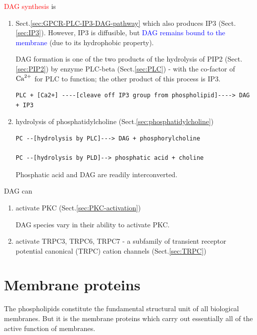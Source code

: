 \textcolor{red}{DAG synthesis} is 
\begin{enumerate}

  \item Sect.\ref{sec:GPCR-PLC-IP3-DAG-pathway} which also produces IP3
  (Sect.\ref{sec:IP3}). However, IP3 is diffusible, but \textcolor{blue}{DAG
  remains bound to the membrane} (due to its hydrophobic property).

DAG formation is one of the two products of the hydrolysis of PIP2
(Sect.\ref{sec:PIP2}) by enzyme PLC-beta (Sect.\ref{sec:PLC}) - with the
co-factor of ${\text{Ca}^{2+}}$ for PLC to function; the other product of this process is
IP3.

\begin{verbatim}
PLC + [Ca2+] ----[cleave off IP3 group from phospholipid]----> DAG + IP3
\end{verbatim}

  \item hydrolysis of phosphatidylcholine (Sect.\ref{sec:phosphatidylcholine})

\begin{verbatim}
PC --[hydrolysis by PLC]---> DAG + phosphorylcholine

PC --[hydrolysis by PLD]--> phosphatic acid + choline
\end{verbatim}

Phosphatic acid and DAG are readily interconverted.

\end{enumerate}


DAG can 
\begin{enumerate}
  \item activate PKC (Sect.\ref{sec:PKC-activation})

DAG species vary in their ability to activate PKC.
  
  \item activate TRPC3, TRPC6, TRPC7 - a subfamily of transient receptor
  potential canonical (TRPC) cation channels (Sect.\ref{sec:TRPC})
  
\end{enumerate}




\section{Membrane proteins}
\label{sec:membrane-proteins}

The phospholipids constitute the fundamental structural unit of all biological
membranes. But it is the membrane proteins which carry out essentially all of
the active function of membranes.

